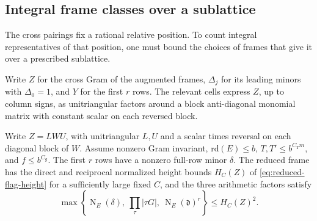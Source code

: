 \subsection{Integral frame classes over a sublattice}

The cross pairings fix a rational relative position. To count integral representatives of that position, one must bound the choices of frames that give it over a prescribed sublattice.

Write \(Z\) for the cross Gram of the augmented frames,
\(\Delta_j\) for its leading minors with \(\Delta_0=1\), and \(Y\) for the
first \(r\) rows. The relevant cells express \(Z\), up to
column signs, as unitriangular factors around a block
anti-diagonal monomial matrix with constant scalar on
each reversed block.

\begin{lemma}\label{lem:reduced-flag-heights}
Write \(Z=LWU\), with unitriangular \(L,U\) and a scalar times reversal
on each diagonal block of \(W\). Assume nonzero Gram invariant,
\(\mathrm{rd}(E)\le b\), \(T,T'\le b^{C_Tm}\), and \(f\le b^{C_g}\).
The first \(r\) rows have a nonzero full-row minor \(\delta\).
The reduced frame has the direct and reciprocal normalized
height bounds \(H_C(Z)\) of \eqref{eq:reduced-flag-height}
for a sufficiently large fixed \(C\),
and the three arithmetic factors satisfy 
\[
 \max\!\left\{\operatorname N_E(\delta),\ \prod_\tau|\tau G|,\ \operatorname N_E(\mathfrak d)^r\right\}\le H_C(Z)^2.
\]

\end{lemma}

